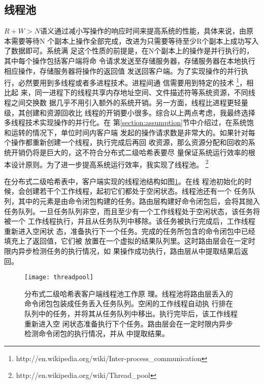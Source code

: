\subsection{线程池}\label{subsection:threadpool}
$R+W>N$语义通过减小写操作的响应时间来提高系统的性能，具体来说，由原本需要等待N
个副本上操作全部完成，改进为只需要等待至少R个副本上成功写入了数据即可。系统满
足这个性质的前提是，在N个副本上的操作是并行执行的，其中每个操作包括客户端将命
令请求发送至存储服务器，存储服务器在本地执行相应操作，存储服务器将操作的返回值
发送回客户端。为了实现操作的并行执行，必然要用到多线程或者多进程技术。进程间通
信需要用到特定的技术
\footnote{http://en.wikipedia.org/wiki/Inter-process\_communication}，相比起
来，同一进程下的线程共享内存地址空间、文件描述符等系统资源，不同线程之间交换数
据几乎不用引入额外的系统开销。另一方面，线程比进程更轻量级，其创建和资源回收比
线程的开销要小很多。综合以上两点考虑，我最终选择多线程技术实现操作的并行化。在
第\ref{section:assumption}节中介绍过，在系统饱和运转的情况下，单位时间内客户端
发起的操作请求数是非常大的。如果针对每个操作都重新创建一个线程，执行完成后再回
收资源，那么资源分配和回收的系统开销仍将是巨大的，这不符合分布式二级哈希表要尽
量保证系统运行效率的根本设计原则。为了进一步提高系统运行效率，我实现了线程池。
\footnote{http://en.wikipedia.org/wiki/Thread\_pool}

在分布式二级哈希表中，客户端实现的线程池结构如图\ref{figure:threadpool}。在线
程池初始化的时候，会创建若干个工作线程，起初它们都处于空闲状态。线程池还有一个
任务队列，其中的元素是由命令闭包构建的任务。路由层构建好命令闭包后，会将其抛入
任务队列。一旦任务队列非空，而且至少有一个工作线程处于空闲状态，该任务将被一个
工作线程执行，并且从任务队列中移除。该任务被执行完成后，工作线程重新进入空闲状
态，准备执行下一个任务。完成的任务所包含的命令闭包中已经填充上了返回值，它们被
放置在一个虚拟的结果队列里。这时路由层会在一定时限内异步检测任务的执行情况，如
果操作成功执行，路由层从中提取结果后返回。
\begin{figure}
  \centering
  \texttt{[image: threadpool]}
  \caption[分布式二级哈希表客户端线程池]{分布式二级哈希表客户端线程池工作原
  理。线程池将路由层丢入的命令闭包包装成任务丢入任务队列。空闲的工作线程自动执
  行排在队列中的任务，并将其从任务队列中移出。执行完毕后，该工作线程重新进入空
  闲状态准备执行下个任务。路由层会在一定时限内异步检测命令闭包的执行情况，并从
  中提取结果。}
  \label{figure:threadpool}
\end{figure}

